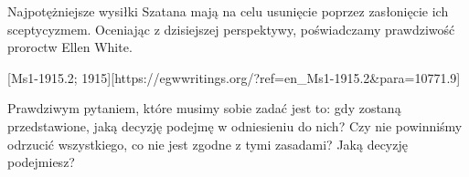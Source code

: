 Najpotężniejsze wysiłki Szatana mają na celu usunięcie  poprzez zasłonięcie ich sceptycyzmem. Oceniając z dzisiejszej perspektywy, poświadczamy prawdziwość proroctw Ellen White.

[Ms1-1915.2; 1915][https://egwwritings.org/?ref=en\_Ms1-1915.2&para=10771.9]

Prawdziwym pytaniem, które musimy sobie zadać  jest to: gdy  zostaną przedstawione, jaką decyzję podejmę w odniesieniu do nich? Czy nie powinniśmy odrzucić wszystkiego, co nie jest zgodne z tymi zasadami? Jaką decyzję podejmiesz?

